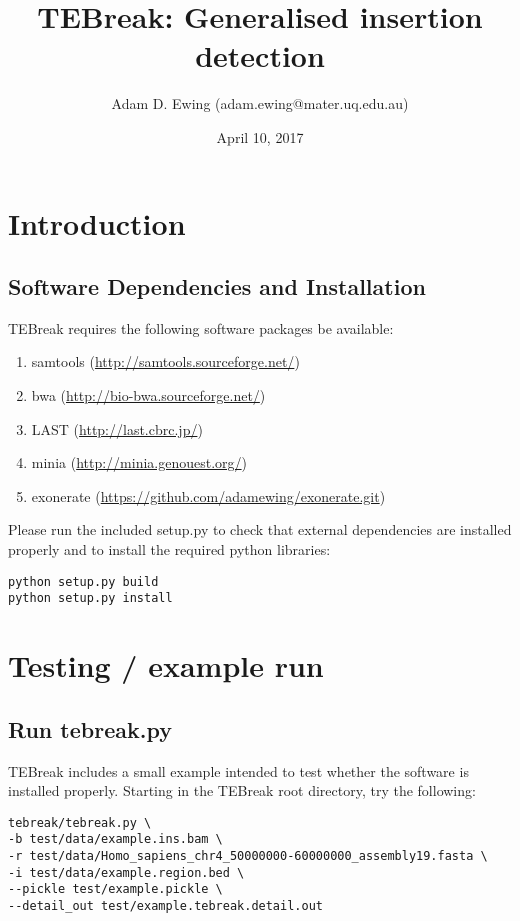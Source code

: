 \documentclass[letterpaper,11pt]{article}
\title{TEBreak: Generalised insertion detection}
\author{Adam D. Ewing (adam.ewing@mater.uq.edu.au)}
\begin{document}
 \date{April 10, 2017}
 \maketitle

\section{Introduction}
\subsection{Software Dependencies and Installation}
TEBreak requires the following software packages be available:

\begin{enumerate}
  \item samtools (\url{http://samtools.sourceforge.net/})
  \item bwa (\url{http://bio-bwa.sourceforge.net/})
  \item LAST (\url{http://last.cbrc.jp/})
  \item minia (\url{http://minia.genouest.org/})
 \item exonerate (\url{https://github.com/adamewing/exonerate.git})
\end{enumerate}

Please run the included setup.py to check that external dependencies are installed properly and to install the required python libraries:

\begin{verbatim}
python setup.py build
python setup.py install
\end{verbatim}

\section{Testing / example run}
\subsection{Run tebreak.py}
TEBreak includes a small example intended to test whether the software is installed properly.
Starting in the TEBreak root directory, try the following:

\begin{verbatim}
tebreak/tebreak.py \
-b test/data/example.ins.bam \
-r test/data/Homo_sapiens_chr4_50000000-60000000_assembly19.fasta \
-i test/data/example.region.bed \
--pickle test/example.pickle \
--detail_out test/example.tebreak.detail.out
\end{verbatim}
\end{document}
